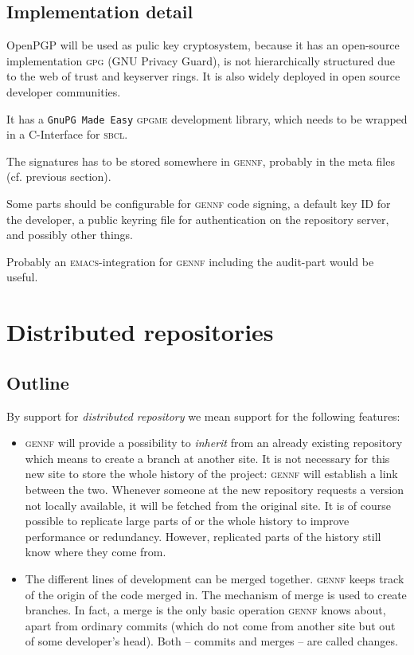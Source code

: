 \documentclass[fleqn, 10pt, a4paper]{report} \usepackage{amssymb}
\begin{document}
\subsection{Implementation detail}

OpenPGP will be used as pulic key cryptosystem, because it has an
open-source implementation \textsc{gpg} (GNU Privacy Guard), is not
hierarchically structured due to the web of trust and keyserver rings.
It is also widely deployed in open source developer communities.

It has a \texttt{GnuPG Made Easy} \textsc{gpgme} development library,
which needs to be wrapped in a C-Interface for \textsc{sbcl}.

The signatures has to be stored somewhere in \textsc{gennf},
probably in the meta files (cf. previous section).

Some parts should be configurable for \textsc{gennf} code signing, a
default key ID for the developer, a public keyring file for
authentication on the repository server, and possibly other things.

Probably an \textsc{emacs}-integration for \textsc{gennf} including
the audit-part would be useful.


\section{Distributed repositories \label{distrib}}

\subsection{Outline}

By support for \emph{distributed repository} we mean support for the
following features:

\begin{itemize}
\item \textsc{gennf} will provide a possibility to \emph{inherit} from
  an already existing repository which means to create a branch at
  another site. It is not necessary for this new site to store the
  whole history of the project: \textsc{gennf} will establish a link
  between the two.  Whenever someone at the new repository requests a
  version not locally available, it will be fetched from the original
  site. It is of course possible to replicate large parts of or the
  whole history to improve performance or redundancy. However,
  replicated parts of the history still know where they come from.

\item The different lines of development can be merged together.
  \textsc{gennf} keeps track of the origin of the code merged in. The
  mechanism of merge is used to create branches. In fact, a merge is
  the only basic operation \textsc{gennf} knows about, apart from
  ordinary commits (which do not come from another site but out of
  some developer's head).  Both -- commits and merges -- are called
  changes.
\end{itemize}
\end{document}
